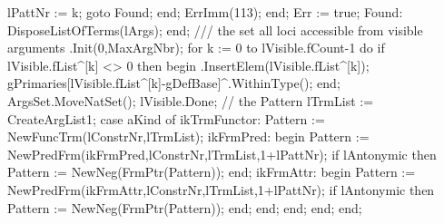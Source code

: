                      lPattNr := k;
                     goto Found;
                  end;
               ErrImm(113);
            end;
            Err := true;
            Found:
               DisposeListOfTerms(lArgs);
         end;
         /// the set all loci accessible from visible arguments
         .Init(0,MaxArgNbr);
         for k := 0 to lVisible.fCount-1 do
            if lVisible.fList^[k] <> 0 then
            begin
               .InsertElem(lVisible.fList^[k]);
               gPrimaries[lVisible.fList^[k]-gDefBase]^.WithinType();
            end;
         ArgsSet.MoveNatSet();
         lVisible.Done;
         // the Pattern
         lTrmList := CreateArgList1;
         case aKind of
            ikTrmFunctor: Pattern := NewFuncTrm(lConstrNr,lTrmList);
            ikFrmPred:
               begin
                  Pattern := NewPredFrm(ikFrmPred,lConstrNr,lTrmList,1+lPattNr);
                  if lAntonymic then Pattern := NewNeg(FrmPtr(Pattern));
               end;
            ikFrmAttr:
               begin
                  Pattern := NewPredFrm(ikFrmAttr,lConstrNr,lTrmList,1+lPattNr);
                  if lAntonymic then Pattern := NewNeg(FrmPtr(Pattern));
               end;
         end;
      end;
   end;
end;
\eatline
{}\nwendcode{}\nwdocspar
\nwenddocs{}\endmoddef\nwstartdeflinemarkup{}\nwenddeflinemarkup
